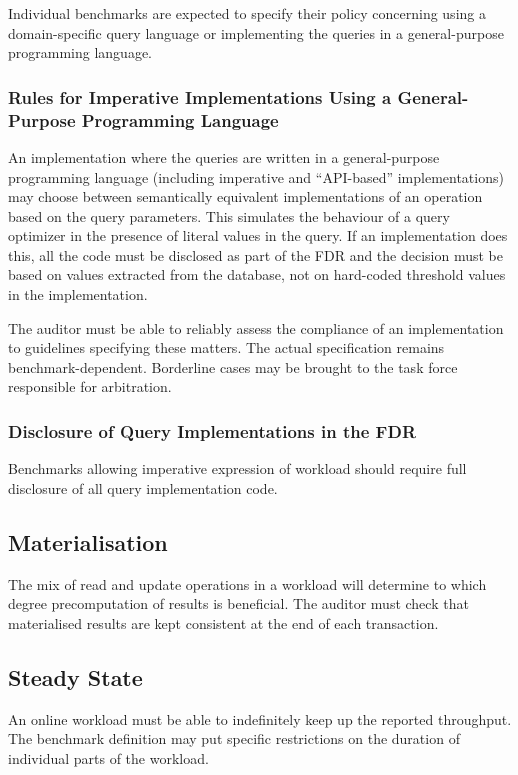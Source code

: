 Individual benchmarks are expected to specify their policy concerning using a domain-specific query language or implementing the queries in a general-purpose programming language.

\subsubsection{Rules for Imperative Implementations Using a General-Purpose Programming Language}
An implementation where the queries are written in a general-purpose programming language (including imperative and ``API-based'' implementations) may choose between semantically equivalent implementations of an operation based on the query parameters. This simulates the behaviour of a query optimizer in the presence of literal values in the query. If an implementation does this, all the code must be disclosed as part of the FDR and the decision must be based on values extracted from the database, not on hard-coded threshold values in the implementation.

The auditor must be able to reliably assess the compliance of an implementation to guidelines specifying these matters. The actual specification remains benchmark-dependent. Borderline cases may be brought to the task force responsible for arbitration.


\subsubsection{Disclosure of Query Implementations in the FDR}
Benchmarks allowing imperative expression of workload should require full disclosure of all query implementation code.

\subsection{Materialisation}

The mix of read and update operations in a workload will determine to which degree precomputation of results is beneficial. The auditor must check that materialised results are kept consistent at the end of each transaction.

\subsection{Steady State}

An online workload must be able to indefinitely keep up the reported throughput. The benchmark definition may put specific restrictions on the duration of individual parts of the workload.


